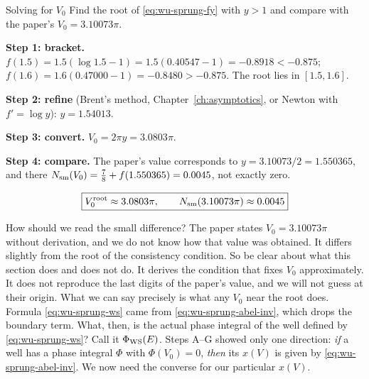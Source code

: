 \begin{sample}{Solving for $V_0$}
Find the root of \eqref{eq:wu-sprung-fy} with $y>1$ and compare with the paper's $V_0=3.10073\pi$.

\textbf{Step 1: bracket.} $f(1.5)=1.5(\log1.5-1)=1.5(0.40547-1)=-0.8918<-0.875$; $f(1.6)=1.6(0.47000-1)=-0.8480>-0.875$. The root lies in $[1.5,1.6]$.

\textbf{Step 2: refine} (Brent's method, Chapter~\ref{ch:asymptotics}, or Newton with $f'=\log y$): $y=1.54013$.

\textbf{Step 3: convert.} $V_0=2\pi y=3.0803\pi$.

\textbf{Step 4: compare.} The paper's value corresponds to $y=3.10073/2=1.550365$, and there $N_{\mathrm{sm}}(V_0)=\tfrac78+f(1.550365)=0.0045$, not exactly zero.

\[
\boxed{V_0^{\rm root}\approx3.0803\pi,\qquad N_{\mathrm{sm}}(3.10073\pi)\approx0.0045}
\]
\end{sample}

How should we read the small difference? The paper states $V_0=3.10073\pi$ without derivation, and we do not know how that value was obtained. It differs slightly from the root of the consistency condition. So be clear about what this section does and does not do. It derives the condition that fixes $V_0$ approximately. It does not reproduce the last digits of the paper's value, and we will not guess at their origin. What we can say precisely is what any $V_0$ near the root does. Formula \eqref{eq:wu-sprung-ws} came from \eqref{eq:wu-sprung-abel-inv}, which drops the boundary term. What, then, is the actual phase integral of the well defined by \eqref{eq:wu-sprung-ws}? Call it $\Phi_{\rm WS}(E)$. Steps A--G showed only one direction: \emph{if} a well has a phase integral $\Phi$ with $\Phi(V_0)=0$, \emph{then} its $x(V)$ is given by \eqref{eq:wu-sprung-abel-inv}. We now need the converse for our particular $x(V)$.

